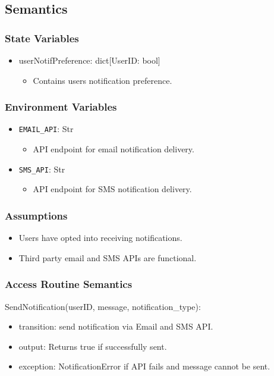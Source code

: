 \documentclass[12pt, titlepage]{article}
\begin{document}
\subsection{Semantics}

\subsubsection{State Variables}
\begin{itemize}
    \item userNotifPreference: dict[UserID: bool]
    \begin{itemize}
        \item Contains users notification preference.
    \end{itemize}
\end{itemize}

\subsubsection{Environment Variables}
\begin{itemize}
    \item \texttt{EMAIL\_API}: Str
    \begin{itemize}
        \item API endpoint for email notification delivery.
    \end{itemize}
    \item \texttt{SMS\_API}: Str
    \begin{itemize}
        \item API endpoint for SMS notification delivery.
    \end{itemize}
\end{itemize}

\subsubsection{Assumptions}
\begin{itemize}
    \item Users have opted into receiving notifications.
    \item Third party email and SMS APIs are functional.
\end{itemize}

\subsubsection{Access Routine Semantics}

\noindent SendNotification(userID, message, notification\_type):
\begin{itemize}
\item transition: send notification via Email and SMS API.
\item output: Returns true if successfully sent.
\item exception: NotificationError if API fails and message cannot be sent.
\end{itemize}
\end{document}
